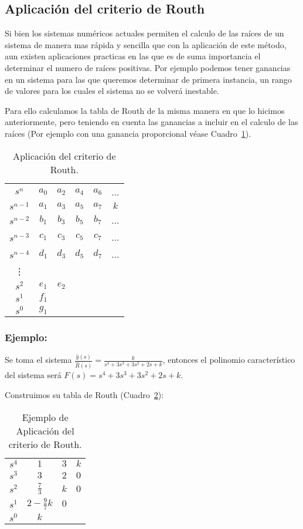 \documentclass[12pt]{article}
\numberwithin{equation}{subsection}
\begin{document}
\subsection{Aplicación del criterio de Routh}
Si bien los sistemas numéricos actuales permiten el calculo de las raíces de un sistema de manera mas rápida y sencilla que con la aplicación de este método, aun existen aplicaciones practicas en las que es de suma importancia el determinar el numero de raíces positivas. Por ejemplo podemos tener ganancias en un sistema para las que queremos determinar de primera instancia, un rango de valores para los cuales el sistema no se volverá inestable.

Para ello calculamos la tabla de Routh de la misma manera en que lo hicimos anteriormente, pero teniendo en cuenta las ganancias a incluir en el calculo de las raíces (Por ejemplo con una ganancia proporcional véase Cuadro~\ref{tab:Aplicacion}).

\begin{table}[htbp]
\centering
\begin{tabular}{c|c c c c c}
$s^n$     & $a_0$ & $a_2$ & $a_4$ & $a_6$ & ...\\
$s^{n-1}$ & $a_1$ & $a_3$ & $a_5$ & $a_7$ & $k$\\
$s^{n-2}$ & $b_1$ & $b_3$ & $b_5$ & $b_7$ & ...\\
$s^{n-3}$ & $c_1$ & $c_3$ & $c_5$ & $c_7$ & ...\\
$s^{n-4}$ & $d_1$ & $d_3$ & $d_5$ & $d_7$ & ...\\
\vdots                                         \\
$s^2$ & $e_1$ & $e_2$                          \\
$s^1$ & $f_1$                                  \\
$s^0$ & $g_1$
\end{tabular}
\caption{\label{tab:Aplicacion}Aplicación del criterio de Routh.}
\end{table}

\subsubsection{Ejemplo:}
Se toma el sistema $\frac{\hat{y}(s)}{\hat{R}(s)} = \frac{k}{s^4 + 3 s^3 + 3 s^2 + 2 s + k}$, entonces el polinomio característico del sistema será $F(s) = s^4 + 3 s^3 + 3 s^2 + 2 s + k$.

Construimos su tabla de Routh (Cuadro~\ref{tab:EjemploAplicacion}):

\begin{table}[htbp]
\centering
\begin{tabular}{c|c c c}
$s^4$ & $1$ & $3$ & $k$ \\
$s^3$ & $3$ & $2$ & $0$ \\
$s^2$ & $\frac{7}{3}$ & $k$ & $0$ \\
$s^1$ & $2 - \frac{9}{7} k$ & $0$ \\
$s^0$ & $k$
\end{tabular}
\caption{\label{tab:EjemploAplicacion}Ejemplo de Aplicación del criterio de Routh.}
\end{table}
\end{document}
